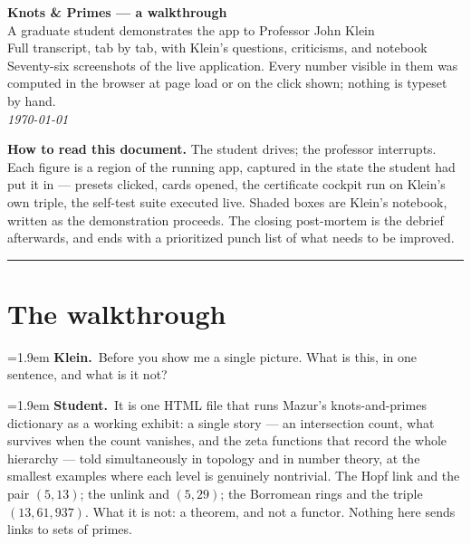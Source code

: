 \documentclass[11pt]{article}
\newcommand{\Stu}[1]{\par\smallskip\noindent\hangindent=1.9em\hangafter=1%
  \textcolor{stucol}{\textbf{Student.}}~#1\par}
\newcommand{\Kle}[1]{\par\smallskip\noindent\hangindent=1.9em\hangafter=1%
  \textcolor{klecol}{\textbf{Klein.}}~#1\par}
\newcommand{\walkbeat}[1]{\par\smallskip{\centering\small\itshape\textcolor{beatgray}{#1}\par}\smallskip}
\begin{document}
\thispagestyle{empty}
\begin{center}
{\LARGE\bfseries Knots \& Primes --- a walkthrough}\\[6pt]
{\large A graduate student demonstrates the app to Professor John Klein}\\[14pt]
{\normalsize Full transcript, tab by tab, with Klein's questions, criticisms, and notebook}\\[4pt]
{\footnotesize Seventy-six screenshots of the live application. Every number visible in them was
computed in the browser at page load or on the click shown; nothing is typeset by hand.}\\[10pt]
{\footnotesize\itshape \today}
\end{center}
\vspace{10pt}
\begin{snugshade}\small
\textbf{How to read this document.} The student drives; the professor interrupts. Each figure is a
region of the running app, captured in the state the student had put it in --- presets clicked, cards
opened, the certificate cockpit run on Klein's own triple, the self-test suite executed live. Shaded
boxes are Klein's notebook, written as the demonstration proceeds. The closing post-mortem is the
debrief afterwards, and ends with a prioritized punch list of what needs to be improved.
\end{snugshade}
\vspace{6pt}
\hrule
\vspace{12pt}

\section*{The walkthrough}
\walkbeat{Klein sits, pulls the laptop a quarter turn toward himself, and does not take his coat off.}

\Kle{Before you show me a single picture. What is this, in one sentence, and what is it not?}

\Stu{It is one HTML file that runs Mazur's knots-and-primes dictionary as a working exhibit: a single story --- an intersection count, what survives when the count vanishes, and the zeta functions that record the whole hierarchy --- told simultaneously in topology and in number theory, at the smallest examples where each level is genuinely nontrivial. The Hopf link and the pair $(5,13)$; the unlink and $(5,29)$; the Borromean rings and the triple $(13,61,937)$. What it is not: a theorem, and not a functor. Nothing here sends links to sets of primes.}
\end{document}
